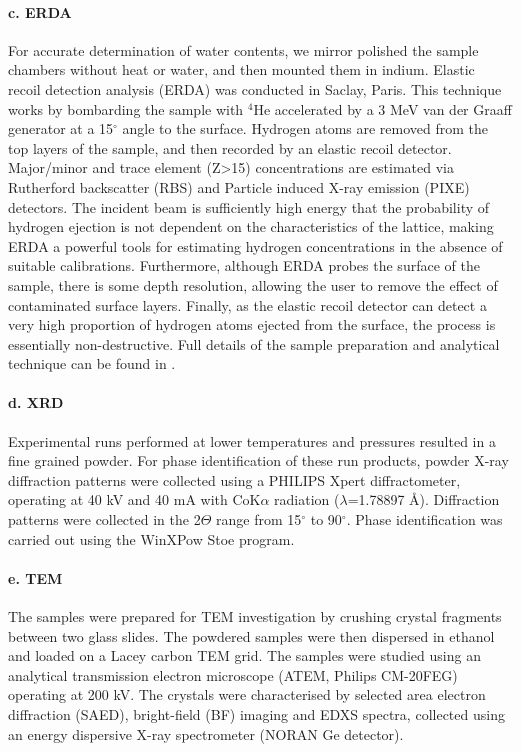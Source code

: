 \documentclass[review]{elsarticle}
\begin{document}
\paragraph{c. ERDA}
For accurate determination of water contents, we mirror polished the sample chambers without heat or water, and then mounted them in indium. Elastic recoil detection analysis (ERDA) was conducted in Saclay, Paris. This technique works by bombarding the sample with $^4$He accelerated by a 3 MeV van der Graaff generator at a 15$^{\circ}$ angle to the surface. Hydrogen atoms are removed from the top layers of the sample, and then recorded by an elastic recoil detector. Major/minor and trace element (Z>15) concentrations are estimated via Rutherford backscatter (RBS) and Particle induced X-ray emission (PIXE) detectors. The incident beam is sufficiently high energy that the probability of hydrogen ejection is not dependent on the characteristics of the lattice, making ERDA a powerful tools for estimating hydrogen concentrations in the absence of suitable calibrations. Furthermore, although ERDA probes the surface of the sample, there is some depth resolution, allowing the user to remove the effect of contaminated surface layers. Finally, as the elastic recoil detector can detect a very high proportion of hydrogen atoms ejected from the surface, the process is essentially non-destructive. Full details of the sample preparation and analytical technique can be found in \citep{WBRH2012}.

\paragraph{d. XRD}
Experimental runs performed at lower temperatures and pressures resulted in a fine grained powder. For phase identification of these run products, powder X-ray diffraction patterns were collected using a PHILIPS Xpert diffractometer, operating at 40 kV and 40 mA with CoK$\alpha$ radiation ($\lambda$=1.78897 \AA). Diffraction patterns were collected in the 2$\Theta$ range from 15$^{\circ}$ to 90$^{\circ}$. Phase identification was carried out using the WinXPow Stoe program.


\paragraph{e. TEM}
The samples were prepared for TEM investigation by crushing crystal fragments between two glass slides. The powdered samples were then dispersed in ethanol and loaded on a Lacey carbon TEM grid. The samples were studied using an analytical transmission electron microscope (ATEM, Philips CM-20FEG) operating at 200 kV. The crystals were characterised by selected area electron diffraction (SAED), bright-field (BF) imaging and EDXS spectra, collected using an energy dispersive X-ray spectrometer (NORAN Ge detector).
\end{document}
